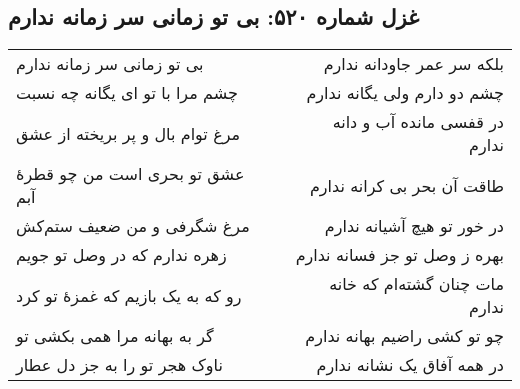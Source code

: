\begin{center}
\section*{غزل شماره ۵۲۰: بی تو زمانی سر زمانه ندارم}
\label{sec:520}
\begin{longtable}{l p{0.5cm} r}
بی تو زمانی سر زمانه ندارم
&&
بلکه سر عمر جاودانه ندارم
\\
چشم مرا با تو ای یگانه چه نسبت
&&
چشم دو دارم ولی یگانه ندارم
\\
مرغ توام بال و پر بریخته از عشق
&&
در قفسی مانده آب و دانه ندارم
\\
عشق تو بحری است من چو قطرهٔ آبم
&&
طاقت آن بحر بی کرانه ندارم
\\
مرغ شگرفی و من ضعیف ستم‌کش
&&
در خور تو هیچ آشیانه ندارم
\\
زهره ندارم که در وصل تو جویم
&&
بهره ز وصل تو جز فسانه ندارم
\\
رو که به یک بازیم که غمزهٔ تو کرد
&&
مات چنان گشته‌ام که خانه ندارم
\\
گر به بهانه مرا همی بکشی تو
&&
چو تو کشی راضیم بهانه ندارم
\\
ناوک هجر تو را به جز دل عطار
&&
در همه آفاق یک نشانه ندارم
\\
\end{longtable}
\end{center}
